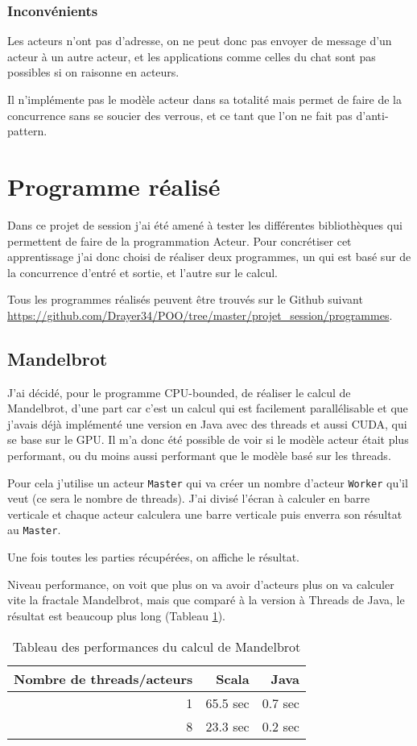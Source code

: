 \documentclass[11pt, a4paper]{article}
\begin{document}
\subsubsection{Inconvénients}
\par Les acteurs n'ont pas d'adresse, on ne peut donc pas envoyer de message d'un acteur à un autre acteur, et les applications comme celles du chat sont pas possibles si on raisonne en acteurs.
\par Il n'implémente pas le modèle acteur dans sa totalité mais permet de faire de la concurrence sans se soucier des verrous, et ce tant que l'on ne fait pas d'anti-pattern.

\section{Programme réalisé}
Dans ce projet de session j'ai été amené à tester les différentes bibliothèques qui permettent de faire de la programmation Acteur. Pour concrétiser cet apprentissage j'ai donc choisi de réaliser deux programmes, un qui est basé sur de la concurrence d'entré et sortie, et l'autre sur le calcul. 
\par Tous les programmes réalisés peuvent être trouvés sur le Github suivant \url{https://github.com/Drayer34/POO/tree/master/projet_session/programmes}.
\subsection{Mandelbrot}
J'ai décidé, pour le programme CPU-bounded, de réaliser le calcul de Mandelbrot, d'une part car c'est un calcul qui est facilement parallélisable et que j'avais déjà implémenté une version en Java avec des threads et aussi CUDA, qui se base sur le GPU. Il m'a donc été possible de voir si le modèle acteur était plus performant, ou du moins aussi performant que le modèle basé sur les threads.
\par 
Pour cela j'utilise un acteur \texttt{Master} qui va créer un nombre d'acteur \texttt{Worker} qu'il veut (ce sera le nombre de threads). J'ai divisé l'écran à calculer en barre verticale et chaque acteur calculera une barre verticale puis enverra son résultat au \texttt{Master}.
\par Une fois toutes les parties récupérées, on affiche le résultat.
\newline
\par Niveau performance, on voit que plus on va avoir d'acteurs plus on va calculer vite la fractale Mandelbrot, mais que comparé à la version à Threads de Java, le résultat est beaucoup plus long (Tableau \ref{tab1}).
\begin{table}[h]
\centering
\begin{tabular}{|r|r|r|}
\hline
Nombre de threads/acteurs  & Scala & Java \\
\hline 
1  & 65.5 sec & 0.7 sec\\
8  & 23.3 sec & 0.2 sec\\
\hline
\end{tabular}
\caption{\label{tab1} Tableau des performances du calcul de Mandelbrot}
\end{table}
\end{document}

